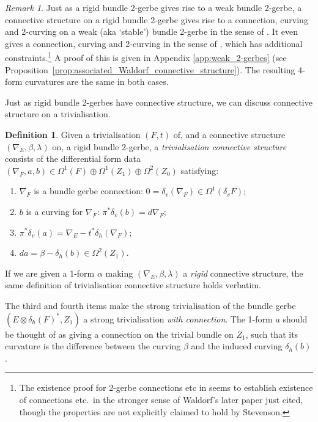 \documentclass[12pt]{amsart}
\theoremstyle{plain}
\theoremstyle{definition}
\newtheorem{definition}[theorem]{Definition}
\theoremstyle{remark}
\newtheorem{remark}[theorem]{Remark}
\numberwithin{equation}{section}
\newcommand{\<}{\langle}
\renewcommand{\>}{\rangle}
\begin{document}
\begin{remark}
Just as a rigid bundle 2-gerbe gives rise to a weak bundle 2-gerbe, a connective structure on a rigid bundle 2-gerbe gives rise to a connection, curving and 2-curving on a weak (aka `stable') bundle 2-gerbe in the sense of \cite[Definition 7.4]{Ste}. 
It even gives a connection, curving and 2-curving in the sense of \cite[Definition 4.1]{Wal}, which has additional constraints.\footnote{The existence proof for 2-gerbe connections etc in \cite{StevPhD} seems to establish existence of connections etc.\ in the stronger sense of Waldorf's later paper just cited, though the properties are not explicitly claimed to hold by Stevenson.}
A proof of this is given in Appendix \ref{app:weak_2-gerbes} (see Proposition~\ref{prop:associated_Waldorf_connective_structure}). 
The resulting 4-form curvatures are the same in both cases.
\end{remark}



Just as rigid bundle 2-gerbes have connective structure, we can discuss connective structure on a trivialisation.

\begin{definition}\label{def:vsb2g_triv_conn_str}
Given a trivialisation $(F,t)$ of, and a connective structure $(\nabla_E,\beta,\lambda)$ on, a rigid bundle 2-gerbe, a \emph{trivialisation connective structure} consists of the differential form data $(\nabla_F,a,b) \in \Omega^1(F)\oplus\Omega^1(Z_1)\oplus \Omega^2(Z_0)$ satisfying:
\begin{enumerate}[(1)]
\item $\nabla_F$ is a bundle gerbe connection: $0=\delta_v(\nabla_F) \in \Omega^1(\delta_vF)$;
\item $b$ is a curving for $\nabla_F$: $\pi^*\delta_v(b) = d\nabla_F$;
\item $\pi^*\delta_v(a) = \nabla_E - t^*\delta_h(\nabla_F)$;
\item $da = \beta - \delta_h(b) \in \Omega^2(Z_1)$.
\end{enumerate}
If we are given a 1-form $\alpha$ making $(\nabla_E,\beta,\lambda)$ a \emph{rigid} connective structure, the same definition of trivialisation connective structure holds verbatim.
\end{definition}

The third and fourth items make the strong trivialisation of the bundle gerbe $(E\otimes \delta_h(F)^*,Z_1)$ a strong trivialisation \emph{with connection}. 
The 1-form $a$ should be thought of as giving a connection on the trivial bundle on $Z_1$, such that its curvature is the difference between the curving $\beta$ and the induced curving $\delta_h(b)$. 
\end{document}
